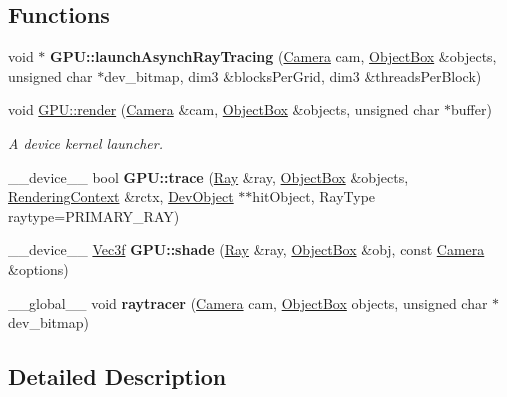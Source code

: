\subsection*{Functions}
\begin{DoxyCompactItemize}
\item 
void $\ast$ {\bfseries G\+P\+U\+::launch\+Asynch\+Ray\+Tracing} (\hyperlink{struct_camera}{Camera} cam, \hyperlink{class_object_box}{Object\+Box} \&objects, unsigned char $\ast$dev\+\_\+bitmap, dim3 \&blocks\+Per\+Grid, dim3 \&threads\+Per\+Block)\hypertarget{group__rendering_gaf46c232fe3675fb30831b3e847df0eca}{}\label{group__rendering_gaf46c232fe3675fb30831b3e847df0eca}

\item 
void \hyperlink{group__rendering_gadd1c99922e3b5c249fac22f8946b5e57}{G\+P\+U\+::render} (\hyperlink{struct_camera}{Camera} \&cam, \hyperlink{class_object_box}{Object\+Box} \&objects, unsigned char $\ast$buffer)\hypertarget{group__rendering_gadd1c99922e3b5c249fac22f8946b5e57}{}\label{group__rendering_gadd1c99922e3b5c249fac22f8946b5e57}

\begin{DoxyCompactList}\small\item\em A device kernel launcher. \end{DoxyCompactList}\item 
\+\_\+\+\_\+device\+\_\+\+\_\+ bool {\bfseries G\+P\+U\+::trace} (\hyperlink{class_ray}{Ray} \&ray, \hyperlink{class_object_box}{Object\+Box} \&objects, \hyperlink{struct_g_p_u_1_1_rendering_context}{Rendering\+Context} \&rctx, \hyperlink{class_dev_object}{Dev\+Object} $\ast$$\ast$hit\+Object, Ray\+Type raytype=P\+R\+I\+M\+A\+R\+Y\+\_\+\+R\+AY)\hypertarget{group__rendering_gab61f39aa210b4af12353c58c82b8f68e}{}\label{group__rendering_gab61f39aa210b4af12353c58c82b8f68e}

\item 
\+\_\+\+\_\+device\+\_\+\+\_\+ \hyperlink{class_vec3}{Vec3f} {\bfseries G\+P\+U\+::shade} (\hyperlink{class_ray}{Ray} \&ray, \hyperlink{class_object_box}{Object\+Box} \&obj, const \hyperlink{struct_camera}{Camera} \&options)\hypertarget{group__rendering_ga5d61799db365527e23364cea7a9f0f40}{}\label{group__rendering_ga5d61799db365527e23364cea7a9f0f40}

\item 
\+\_\+\+\_\+global\+\_\+\+\_\+ void {\bfseries raytracer} (\hyperlink{struct_camera}{Camera} cam, \hyperlink{class_object_box}{Object\+Box} objects, unsigned char $\ast$dev\+\_\+bitmap)\hypertarget{group__rendering_ga60a999f6f314338d105c33e96885a474}{}\label{group__rendering_ga60a999f6f314338d105c33e96885a474}

\end{DoxyCompactItemize}


\subsection{Detailed Description}
